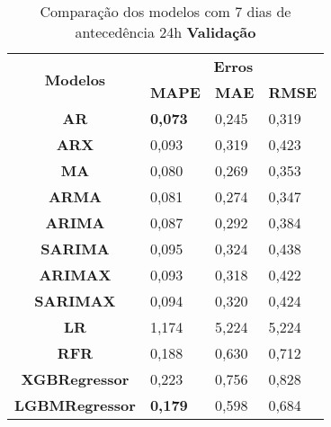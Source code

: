 \begin{table}[H]
	\centering
	\caption{Comparação dos modelos com 7 dias de antecedência 24h \textbf{Validação} }\label{tb:10-24vld}
	\begin{tabular}{@{}clll@{}}
		\toprule
		\multirow{2}{*}{\textbf{Modelos}} & \multicolumn{3}{c}{\textbf{Erros}}                                                                       \\ \cmidrule(l){2-4} 
		& \multicolumn{1}{c}{\textbf{MAPE}} & \multicolumn{1}{c}{\textbf{MAE}} & \multicolumn{1}{c}{\textbf{RMSE}} \\ \hline
\textbf{AR}                       & \textbf{0,073}                             & 0,245                            & 0,319                             \\
\textbf{ARX}                      & 0,093                             & 0,319                            & 0,423                             \\
\textbf{MA}                       & 0,080                             & 0,269                            & 0,353                             \\
\textbf{ARMA}                     & 0,081                             & 0,274                            & 0,347                             \\
\textbf{ARIMA}                    & 0,087                             & 0,292                            & 0,384                             \\
\textbf{SARIMA}                   & 0,095                             & 0,324                            & 0,438                             \\
\textbf{ARIMAX}                   & 0,093                             & 0,318                            & 0,422                             \\
\textbf{SARIMAX}                  & 0,094                             & 0,320                            & 0,424                             \\
\textbf{LR}                       & 1,174                             & 5,224                            & 5,224                             \\
\textbf{RFR}                      & 0,188                             & 0,630                            & 0,712                             \\
\textbf{XGBRegressor}             & 0,223                             & 0,756                            & 0,828                             \\
\textbf{LGBMRegressor}            & \textbf{0,179}                             & 0,598                            & 0,684                             \\ \bottomrule
	\end{tabular}

\end{table}

